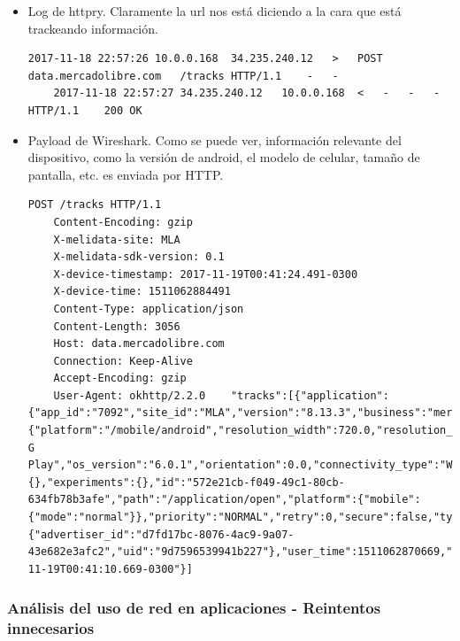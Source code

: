 \begin{itemize}
  
  \item Log de httpry. Claramente la url nos está diciendo a la cara que está trackeando información.
  
  \begin{lstlisting}[style=base]
    2017-11-18 22:57:26	10.0.0.168	34.235.240.12	>	POST	data.mercadolibre.com	/tracks	HTTP/1.1	-	-
    2017-11-18 22:57:27	34.235.240.12	10.0.0.168	<	-	-	-	HTTP/1.1	200	OK
  \end{lstlisting}
  
  \item Payload de Wireshark. Como se puede ver, información relevante del dispositivo, como la versión de android, el modelo de celular, tamaño de pantalla, etc. es enviada por HTTP.
  
  \begin{lstlisting}[style=base]
    POST /tracks HTTP/1.1
    Content-Encoding: gzip
    X-melidata-site: MLA
    X-melidata-sdk-version: 0.1
    X-device-timestamp: 2017-11-19T00:41:24.491-0300
    X-device-time: 1511062884491
    Content-Type: application/json
    Content-Length: 3056
    Host: data.mercadolibre.com
    Connection: Keep-Alive
    Accept-Encoding: gzip
    User-Agent: okhttp/2.2.0	"tracks":[{"application":{"app_id":"7092","site_id":"MLA","version":"8.13.3","business":"mercadolibre"},"sequential_id":1899,@"device":{"platform":"/mobile/android","resolution_width":720.0,"resolution_height":1184.0,"device_id":"52c0d4d328a147de","auto_time":true,"device_name":"Moto G Play","os_version":"6.0.1","orientation":0.0,"connectivity_type":"WIFI"}@,"event_data":{},"experiments":{},"id":"572e21cb-f049-49c1-80cb-634fb78b3afe","path":"/application/open","platform":{"mobile":{"mode":"normal"}},"priority":"NORMAL","retry":0,"secure":false,"type":"event","user":{"advertiser_id":"d7fd17bc-8076-4ac9-9a07-43e682e3afc2","uid":"9d7596539941b227"},"user_time":1511062870669,"user_local_timestamp":"2017-11-19T00:41:10.669-0300"}]
  \end{lstlisting}
  
\end{itemize}

\newpage


\subsubsection{Análisis del uso de red en aplicaciones - Reintentos innecesarios}

